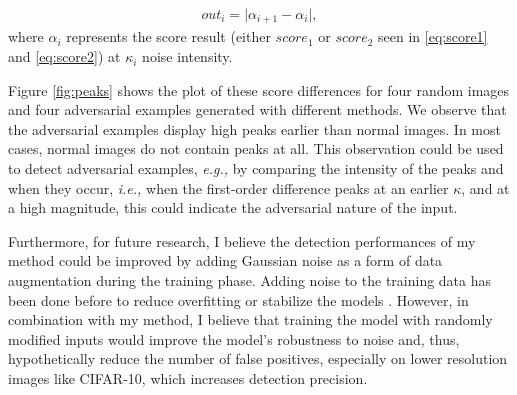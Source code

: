 \begin{align}
    \label{eq:first-order-diff}
    out_i= \lvert \alpha_{i+1} - \alpha_{i} \rvert,
\end{align}
where $\alpha_i$ represents the score result (either $score_1$ or $score_2$ seen
in \ref{eq:score1} and \ref{eq:score2}) at $\kappa_i$ noise intensity.

Figure \ref{fig:peaks} shows the plot of these score differences for four random
images and four adversarial examples generated with different methods. We
observe that the adversarial examples display high peaks earlier than normal
images. In most cases, normal images do not contain peaks at all. This
observation could be used to detect adversarial examples, \emph{e.g.,} by
comparing the intensity of the peaks and when they occur, \emph{i.e.,} when the
first-order difference peaks at an earlier $\kappa$, and at a high magnitude,
this could indicate the adversarial nature of the input.

Furthermore, for future research, I believe the detection performances of my
method could be improved by adding Gaussian noise as a form of data augmentation
during the training phase. Adding noise to the training data has been done
before to reduce overfitting or stabilize the models
\cite{zheng_improving_2016}. However, in combination with my method, I believe
that training the model with randomly modified inputs would improve the model's
robustness to noise and, thus, hypothetically reduce the number of false
positives, especially on lower resolution images like CIFAR-10, which increases
detection precision.